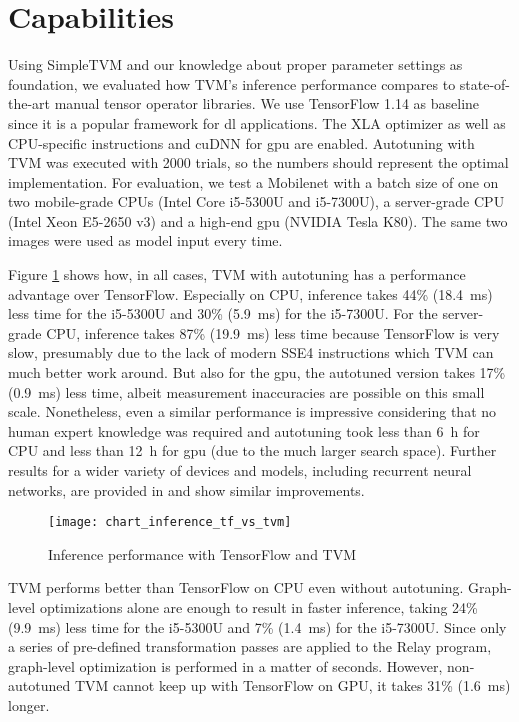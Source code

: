 \section{Capabilities}
Using SimpleTVM and our knowledge about proper parameter settings as foundation, we evaluated how TVM's inference performance compares to state-of-the-art manual tensor operator libraries. We use TensorFlow 1.14 as baseline since it is a popular framework for \gls{dl} applications. The XLA optimizer as well as CPU-specific instructions and cuDNN for \gls{gpu} are enabled. Autotuning with TVM was executed with 2000 trials, so the numbers should represent the optimal implementation. For evaluation, we test a Mobilenet with a batch size of one on two mobile-grade CPUs (Intel Core i5-5300U and i5-7300U), a server-grade CPU (Intel Xeon E5-2650 v3) and a high-end \gls{gpu} (NVIDIA Tesla K80). The same two images were used as model input every time.

Figure \ref{fig:inf-tf-tvm} shows how, in all cases, TVM with autotuning has a performance advantage over TensorFlow. Especially on CPU, inference takes 44\% (\SI{18.4}{\milli\second}) less time for the i5-5300U and 30\% (\SI{5.9}{\milli\second}) for the i5-7300U. For the server-grade CPU, inference takes 87\% (\SI{19.9}{\milli\second}) less time because TensorFlow is very slow, presumably due to the lack of modern SSE4 instructions which TVM can much better work around. But also for the \gls{gpu}, the autotuned version takes 17\% (\SI{0.9}{\milli\second}) less time, albeit measurement inaccuracies are possible on this small scale. Nonetheless, even a similar performance is impressive considering that no human expert knowledge was required and autotuning took less than \SI{6}{\hour} for CPU and less than \SI{12}{\hour} for \gls{gpu} (due to the much larger search space). Further results for a wider variety of devices and models, including recurrent neural networks, are provided in \cite{Chen.2018} and show similar improvements.

\begin{figure}
	\centering
	\texttt{[image: chart\_inference\_tf\_vs\_tvm]}%
	\caption{Inference performance with TensorFlow and TVM}
	\label{fig:inf-tf-tvm}
\end{figure}

TVM performs better than TensorFlow on CPU even without autotuning. Graph-level optimizations alone are enough to result in faster inference, taking 24\% (\SI{9.9}{\milli\second}) less time for the i5-5300U and 7\% (\SI{1.4}{\milli\second}) for the i5-7300U. Since only a series of pre-defined transformation passes are applied to the Relay program, graph-level optimization is performed in a matter of seconds. However, non-autotuned TVM cannot keep up with TensorFlow on GPU, it takes 31\% (\SI{1.6}{\milli\second}) longer.

